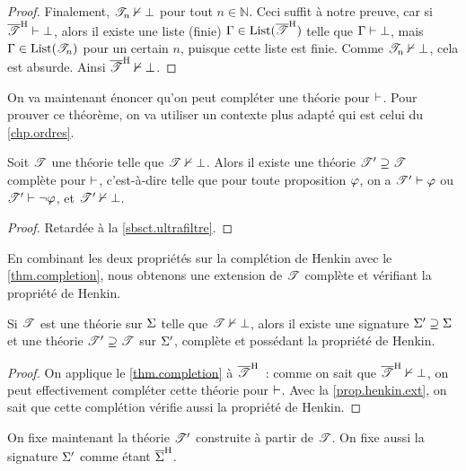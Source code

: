 \begin{proof}
  Finalement, $\mathscr T_n\nvdash\bot$ pour tout $n\in \mathbb N$. Ceci suffit à
  notre preuve, car si $\overline{\mathscr T}^{\mathrm H}\vdash \bot$, alors il existe une
  liste (finie) $\Gamma\in\operatorname{List}(\overline{\mathscr T}^{\mathrm H})$ telle que
  $\Gamma\vdash\bot$, mais $\Gamma\in\operatorname{List}(\mathscr T_n)$ pour un certain $n$,
  puisque cette liste est finie. Comme $\mathscr T_n\nvdash\bot$, cela est
  absurde. Ainsi $\overline{\mathscr T}^{\mathrm H}\nvdash\bot$.
\end{proof}

\noindent
On va maintenant énoncer qu'on peut compléter une théorie pour $\vdash$. Pour
prouver ce théorème, on va utiliser un contexte plus adapté qui est celui du
\cref{chp.ordres}.

\begin{theorem}\label{thm.completion}
  Soit $\mathscr T$ une théorie telle que $\mathscr T \nvdash \bot$. Alors il
  existe une théorie $\mathscr T' \supseteq \mathscr T$ complète pour $\vdash$,
  c'est-à-dire telle que pour toute proposition $\varphi$, on a
  $\mathscr T'\vdash \varphi$ ou $\mathscr T'\vdash \lnot \varphi$, et
  $\mathscr T'\nvdash\bot$.
\end{theorem}

\begin{proof}
  Retardée à la \cref{sbsct.ultrafiltre}.
\end{proof}

\noindent
En combinant les deux propriétés sur la complétion de Henkin avec le
\cref{thm.completion}, nous obtenons une extension de $\mathscr T$ complète et
vérifiant la propriété de Henkin.

\begin{lemma}
  Si $\mathscr T$ est une théorie sur $\Sigma$ telle que
  $\mathscr T\nvdash\bot$, alors il existe une signature
  $\Sigma'\supseteq\Sigma$ et une théorie
  $\mathscr T'\supseteq\mathscr T$ sur $\Sigma'$, complète et possédant la
  propriété de Henkin.
\end{lemma}

\begin{proof}
  On applique le \cref{thm.completion} à $\overline{\mathscr T}^{\mathrm H}$~: comme on sait
  que $\overline{\mathscr T}^{\mathrm H}\nvdash\bot$, on peut effectivement compléter cette
  théorie pour $\vdash$. Avec la \cref{prop.henkin.ext}, on sait que cette
  complétion vérifie aussi la propriété de Henkin.
\end{proof}

\noindent
On fixe maintenant la théorie $\mathscr T'$ construite à partir de $\mathscr T$.
On fixe aussi la signature $\Sigma'$ comme étant $\overline{\Sigma}^{\mathrm H}$.


